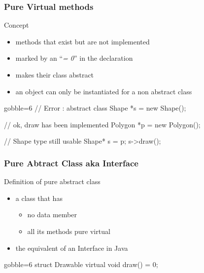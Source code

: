 \begin{frame}[fragile]
  \frametitle{Pure Virtual methods}
  \begin{block}{Concept}
    \begin{itemize}
    \item methods that exist but are not implemented
      \item marked by an ``{\it = 0}'' in the declaration
    \item makes their class abstract
    \item an object can only be instantiated for a non abstract class
    \end{itemize}
  \end{block}
  \pause
  \begin{multicols}{2}
    \begin{cppcode*}{gobble=6}
      // Error : abstract class
      Shape *s = new Shape();

      // ok, draw has been implemented
      Polygon *p = new Polygon();
      
      // Shape type still usable
      Shape* s = p;
      s->draw();
    \end{cppcode*}
    \columnbreak
    \center
  \end{multicols}
\end{frame}

\begin{frame}[fragile]
  \frametitle{Pure Abtract Class aka Interface}
  \begin{block}{Definition of pure abstract class}
    \begin{itemize}
    \item a class that has
      \begin{itemize}
        \item no data member
        \item all its methods pure virtual
      \end{itemize}
    \item the equivalent of an Interface in Java
    \end{itemize}
  \end{block}
  \begin{multicols}{2}
    \begin{cppcode*}{gobble=6}
      struct Drawable {
        virtual void draw() = 0;
      }
    \end{cppcode*}
    \columnbreak
    \center
  \end{multicols}
\end{frame}

